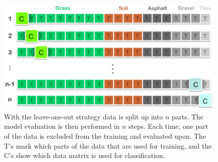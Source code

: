 



\begin{figure}[h]
	\label{fig:loo}
	\centering
	\includegraphics[scale=0.3]{figs_temp/loo.jpg}
	\caption{With the leave-one-out strategy data is split up into $n$ parts. The model evaluation is then performed in $n$ steps. Each time, one part of the data is excluded from the training and evaluated upon. The T's mark which parts of the data that are used for training, and the C's show which data matrix is used for classification.}
\end{figure}


